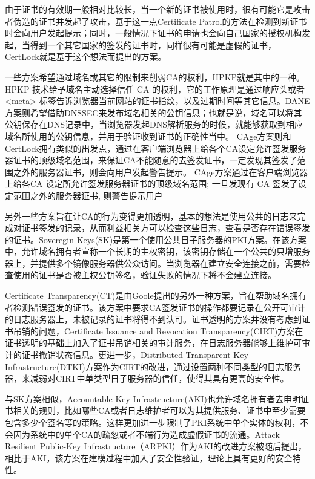 由于证书的有效期一般相对比较长，当一个新的证书被使用时，很有可能它是攻击者伪造的证书并发起了攻击，基于这一点Certificate Patrol\supercite{modell2014certificate}的方法在检测到新证书时会向用户发起提示；同时，一般情况下证书的申请也会向自己国家的授权机构发起，当得到一个其它国家的签发的证书时，同样很有可能是虚假的证书，CertLock\supercite{soghoian2011certified}就是基于这个想法而提出的方案。%



一些方案希望通过域名或其它的限制来削弱CA的权利，HPKP\supercite{evans2015public}就是其中的一种。HPKP 技术给予域名主动选择信任 CA 的权利，它的工作原理是通过响应头或者 <meta> 标签告诉浏览器当前网站的证书指纹，以及过期时间等其它信息。DANE\supercite{barnes2011dane}方案则希望借助DNSSEC来发布域名相关的公钥信息；也就是说，域名可以将其公钥保存在DNS记录中，当浏览器发起DNS解析服务的时候，就能够获取到相应域名所使用的公钥信息，并用于验证收到证书的正确性当中。
CAge方案则和CertLock拥有类似的出发点，通过在客户端浏览器上给各个CA设定允许签发服务器证书的顶级域名范围，来保证CA不能随意的去签发证书，一定发现其签发了范围之外的服务器证书，则会向用户发起警告提示。
CAge方案通过在客户端浏览器上给各CA 设定所允许签发服务器证书的顶级域名范围; 一旦发现有 CA 签发了设定范围之外的服务器证书, 则警告提示用户

另外一些方案旨在让CA的行为变得更加透明，基本的想法是使用公共的日志来完成对证书签发的记录，从而利益相关方可以检查这些日志，查看是否存在错误签发的证书。Soveregin Keys(SK)\supercite{eckersley2012internet}是第一个使用公共日子服务器的PKI方案。在该方案中，允许域名拥有者宣称一个长期的主权密钥，该密钥存储在一个公共的只增服务器上，并提供多个镜像服务器供公众访问。当浏览器在建立安全连接之前，需要检查使用的证书是否被主权公钥签名，验证失败的情况下将不会建立连接。

Certificate Transparency(CT)\supercite{laurie2013certificate}是由Goole提出的另外一种方案，旨在帮助域名拥有者检测错误签发的证书。该方案中要求CA签发证书的操作都要记录在公开可审计的日志服务器上，未被记录的证书将得不到认可。证书透明的方案并没有考虑到证书吊销的问题，Certificate Issuance and Revocation Transparency(CIRT)\supercite{ryan2014enhanced}方案在证书透明的基础上加入了证书吊销相关的审计服务，在日志服务器能够上维护可审计的证书撤销状态信息。更进一步，Distributed Transparent Key Infrastructure(DTKI)\supercite{cheval2014dtki}方案作为CIRT的改进，通过设置两种不同类型的日志服务器，来减弱对CIRT中单类型日子服务器的信任，使得其具有更高的安全性。


与SK方案相似，Accountable Key Infrastructure(AKI)\supercite{kim2013accountable}也允许域名拥有者去申明证书相关的规则，比如哪些CA或者日志维护者可以为其提供服务、证书中至少需要包含多少个签名等的策略。这样更加进一步限制了PKI系统中单个实体的权利，不会因为系统中的单个CA的疏忽或者不端行为造成虚假证书的流通。Attack Resilient Public-Key Infrastructure（ARPKI）\supercite{basin2014arpki}作为AKI的改进方案被随后提出，相比于AKI，该方案在建模过程中加入了安全性验证，理论上具有更好的安全特性。





